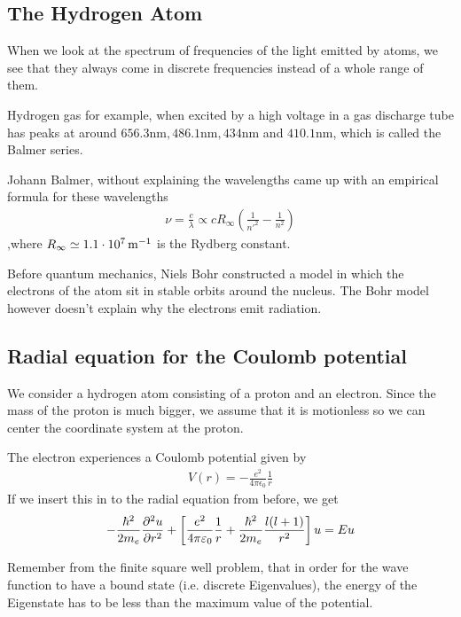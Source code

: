\subsection{The Hydrogen Atom}
When we look at the spectrum of frequencies of the light emitted by atoms, we see that they always come in discrete frequencies instead of a whole range of them.

Hydrogen gas for example, when excited by a high voltage in a gas discharge tube has peaks at around $656.3 \text{nm}, 486.1 \text{nm}, 434 \text{nm}$ and $410.1 \text{nm}$, which is called the Balmer series.

Johann Balmer, without explaining the wavelengths came up with an empirical formula for these wavelengths
\begin{align*}
	\nu = \frac{c}{\lambda} \propto c R_{\infty} \left(
		\frac{1}{n'^2} - \frac{1}{n^2}
	\right)
\end{align*}
,where $R_{\infty} \simeq 1.1 \cdot 10^{7} \operatorname{m}^{-1}$ is the Rydberg constant.

Before quantum mechanics, Niels Bohr constructed a model in which the electrons of the atom sit in stable orbits around the nucleus. The Bohr model however doesn't explain why the electrons emit radiation.


\subsection{Radial equation for the Coulomb potential}
We consider a hydrogen atom consisting of a proton and an electron. Since the mass of the proton is much bigger, we assume that it is motionless so we can center the coordinate system at the proton.

The electron experiences a Coulomb potential given by
\begin{align*}
	V(r) = - \frac{e^2}{4\pi \epsilon_0} \frac{1}{r}
\end{align*}
If we insert this in to the radial equation from before, we get
\begin{align*}
	-\frac{\hbar^{2}}{2m_{e}} \frac{\partial^2 u}{\partial r^2} + \left[\frac{e^2}{4\pi \varepsilon_0}\frac{1}{r} + \frac{\hbar^{2}}{2m_{e}} \frac{l(l+1)}{r^2}\right] u = Eu
\end{align*}

Remember from the finite square well problem, that in order for the wave function to have a bound state (i.e. discrete Eigenvalues), the energy of the Eigenstate has to be less than the maximum value of the potential. 

